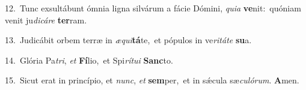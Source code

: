 {\numbfont\textcolor{\numbcolor}{12.}}~Tunc exsultábunt ómnia ligna silvárum a fácie Dómini, \textit{qui}\-\textit{a} \textbf{ve}\-nit:~\star quóniam venit ju\-\textit{di}\-\textit{cá}\textit{re} \textbf{ter}\-ram.\par
{\numbfont\textcolor{\numbcolor}{13.}}~Judicábit orbem terræ in \textit{æ}\-\textit{qui}\textbf{tá}te,~\star et pópulos in ve\-\textit{ri}\-\textit{tá}\textit{te} \textbf{su}\-a.\par
{\numbfont\textcolor{\numbcolor}{14.}}~Glória Pa\-\textit{tri}\-, \textit{et} \textbf{Fí}\-lio,~\star et Spi\-\textit{rí}\-\textit{tu}\textit{i} \textbf{Sanc}\-to.\par
{\numbfont\textcolor{\numbcolor}{15.}}~Sicut erat in princípio, et \textit{nunc}\-, \textit{et} \textbf{sem}\-per,~\star et in sǽcula sæ\-\textit{cu}\-\textit{ló}\textit{rum}. \textbf{A}\-men.\par

